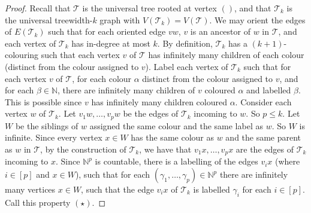 \documentclass[a4paper,11pt]{article}
\theoremstyle{plain}
\theoremstyle{definition}
\renewcommand{\leq}{\leqslant}
\newcommand{\TT}{\mathcal{T}}
\newcommand{\NN}{\mathbb{N}}
\begin{document}
\begin{proof}
Recall that $\TT$ is the universal tree rooted at vertex $()$, and that $\TT_k$ is the universal treewidth-$k$ graph with $V(\TT_k)=V(\TT)$. We may orient the edges of $E(\TT_k)$ such that for each oriented edge $vw$, $v$ is an ancestor of $w$ in $\TT$, and each vertex of $\TT_k$ has in-degree at most $k$. By definition, $\TT_k$ has a $(k+1)$-colouring such that each vertex $v$ of $\TT$ has infinitely many children of each colour (distinct from the colour assigned to $v$). Label each vertex of $\TT_k$ such that for each vertex $v$ of $\TT$, for each colour $\alpha$ distinct from the colour assigned to $v$, and for each $\beta\in \NN$, there are infinitely many children of $v$ coloured $\alpha$ and labelled $\beta$. This is possible since $v$ has infinitely many children coloured $\alpha$. Consider each vertex $w$ of $\TT_k$. Let $v_1w,\dots,v_pw$ be the edges of $\TT_k$ incoming to $w$. So $p\leq k$. Let $W$ be the siblings of $w$ assigned the same colour and the same label as $w$. So $W$ is infinite. Since every vertex $x\in W$ has the same colour as $w$ and the same parent as $w$ in $\TT$, by the construction of $\TT_k$, we have that $v_1x,\dots,v_px$ are the edges of $\TT_k$ incoming to $x$. Since $\NN^p$ is countable, there is a labelling of the edges $v_ix$ (where $i\in[p]$ and $x\in W$), such that for each $(\gamma_1,\dots,\gamma_p)\in \NN^p$ there are infinitely many vertices $x\in W$, such that the edge $v_ix$ of $\TT_k$ is labelled $\gamma_i$ for each $i\in[p]$. Call this property $(\star)$. 


\end{proof}
\end{document}
